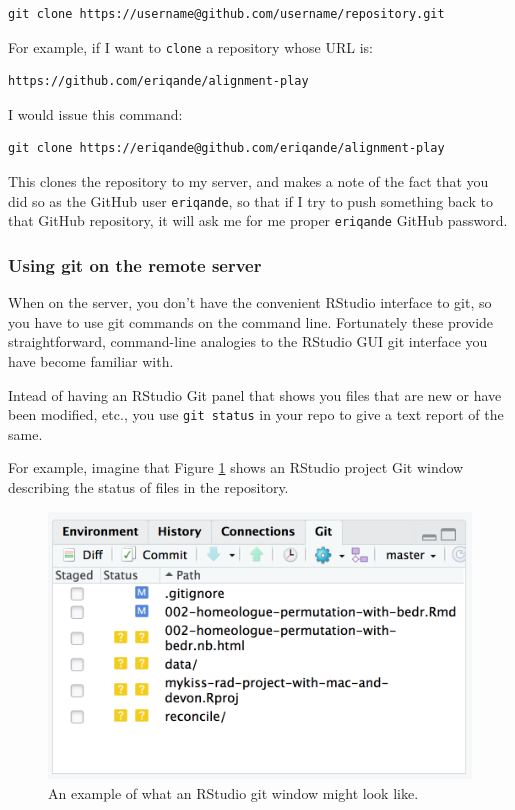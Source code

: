 \documentclass[]{krantz}
\begin{document}
\begin{verbatim}
git clone https://username@github.com/username/repository.git
\end{verbatim}

For example, if I want to \texttt{clone} a repository whose URL is:

\begin{verbatim}
https://github.com/eriqande/alignment-play
\end{verbatim}

I would issue this command:

\begin{verbatim}
git clone https://eriqande@github.com/eriqande/alignment-play
\end{verbatim}

This clones the repository to my server, and makes
a note of the fact that you did so as the GitHub user \texttt{eriqande},
so that if I try to push something back to that GitHub repository,
it will ask me for me proper \texttt{eriqande} GitHub password.

\hypertarget{using-git-on-the-remote-server}{%
\subsubsection{Using git on the remote server}\label{using-git-on-the-remote-server}}

When on the server, you don't have the convenient RStudio interface
to git, so you have to use git commands on the command line. Fortunately
these provide straightforward, command-line analogies to the RStudio
GUI git interface you have become familiar with.

Intead of having an RStudio Git panel that shows you files that are new or
have been modified, etc., you use \texttt{git\ status} in your repo to give
a text report of the same.

For example, imagine that Figure \ref{fig:git-window} shows an RStudio project Git window describing the status of files in the repository.

\begin{figure}

{\centering \includegraphics{figs/git-window} 

}

\caption{An example of what an RStudio git window might look like.}\label{fig:git-window}
\end{figure}
\end{document}
